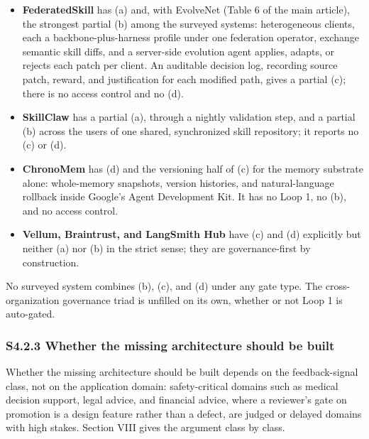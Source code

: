 \documentclass[
]{article}
\begin{document}
\begin{itemize}
  \textbf{Sierra Agent OS 2.0} has a partial (a). Its cross-organization
  promotion is claimed in vendor documentation only and not counted as
  evidence under the tier rule of Section III, and its GitHub-style
  Workspaces give some lineage but not access control with rollback in
  the strict sense.
\item
  \textbf{FederatedSkill} \cite{yang2026federatedskill} has (a) and,
  with EvolveNet (Table 6 of the main article), the strongest partial
  (b) among the surveyed systems: heterogeneous clients, each a
  backbone-plus-harness profile under one federation operator, exchange
  semantic skill diffs, and a server-side evolution agent applies,
  adapts, or rejects each patch per client. An auditable decision log,
  recording source patch, reward, and justification for each modified
  path, gives a partial (c); there is no access control and no (d).
\item
  \textbf{SkillClaw} \cite{ma2026skillclaw} has a partial (a), through
  a nightly validation step, and a partial (b) across the users of one
  shared, synchronized skill repository; it reports no (c) or (d).
\item
  \textbf{ChronoMem} \cite{su2026chronomem} has (d) and the versioning
  half of (c) for the memory substrate alone: whole-memory snapshots,
  version histories, and natural-language rollback inside Google's Agent
  Development Kit. It has no Loop 1, no (b), and no access control.
\item
  \textbf{Vellum, Braintrust, and LangSmith Hub} have (c) and (d)
  explicitly but neither (a) nor (b) in the strict sense; they are
  governance-first by construction.
\end{itemize}

No surveyed system combines (b), (c), and (d) under any gate type. The
cross-organization governance triad is unfilled on its own, whether or
not Loop 1 is auto-gated.

\subsubsection{S4.2.3 Whether the missing architecture should be
built}\label{s4.2.3-whether-the-missing-architecture-should-be-built}

Whether the missing architecture should be built depends on the
feedback-signal class, not on the application domain: safety-critical
domains such as medical decision support, legal advice, and financial
advice, where a reviewer's gate on promotion is a design feature rather
than a defect, are judged or delayed domains with high stakes. Section
VIII gives the argument class by class.
\end{document}
